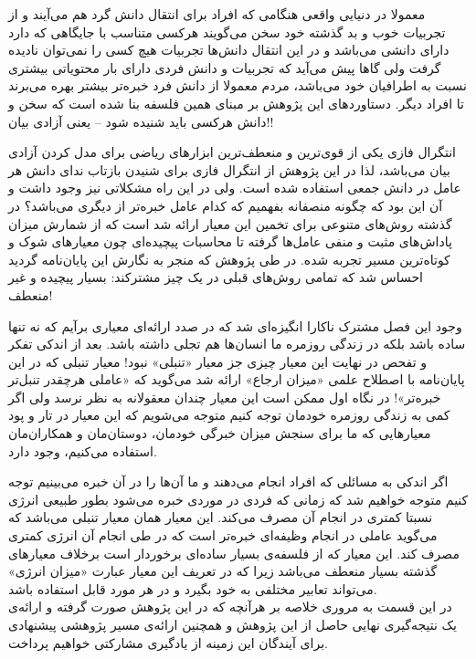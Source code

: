 معمولا در دنیایی واقعی هنگامی که افراد برای انتقال دانش گرد هم می‌آیند و از تجربیات خوب و بد گذشته خود سخن می‌گویند هرکسی متناسب با جایگاهی که دارد دارای دانشی می‌باشد و در این انتقال دانش‌ها تجربیات هیچ کسی را نمی‌توان نادیده گرفت ولی گاها پیش می‌آید که تجربیات و دانش فردی دارای بار محتویاتی بیشتری نسبت به اطرافیان خود می‌باشد، مردم معمولا از دانش فرد خبره‌تر بیشتر بهره می‌برند تا افراد دیگر. دستاورد‌های این پژوهش بر مبنای همین فلسفه بنا شده است که سخن و دانش هرکسی باید شنیده شود -- یعنی آزادی بیان!!

انتگرال فازی یکی از قوی‌ترین و منعطف‌ترین ابزارهای ریاضی برای مدل کردن آزادی بیان می‌باشد، لذا در این پژوهش از انتگرال فازی برای شنیدن بازتاب ندای دانش هر عامل در دانش جمعی استفاده شده است. ولی در این راه مشکلاتی نیز وجود داشت و آن این بود که چگونه منصفانه بفهمیم که کدام عامل خبره‌تر از دیگری می‌باشد؟ در گذشته روش‌های متنوعی برای تخمین این معیار ارائه شد است که از شمارش میزان پاداش‌های مثبت و منفی عامل‌ها گرفته تا محاسبات پیچیده‌ای چون معیار‌های شوک و کوتاه‌ترین مسیر تجربه شده. در طی پژوهش که منجر به نگارش این پایان‌نامه گردید احساس شد که تمامی روش‌های قبلی در یک چیز مشترکند: بسیار پیچیده و غیر منعطف!

وجود این فصل مشترک ناکارا انگیزه‌ای شد که در صدد ارائه‌ای معیاری برآیم که نه تنها ساده باشد بلکه در زندگی روزمره ما انسان‌ها هم تجلی داشته باشد. بعد از اندکی تفکر و تفحص در نهایت این معیار چیزی جز معیار «تنبلی» نبود! معیار تنبلی که در این پایان‌نامه با اصطلاح علمی «میزان ارجاع» ارائه شد می‌گوید که «عاملی هرچقدر تنبل‌تر خبره‌تر»! در نگاه اول ممکن است این معیار چندان معقولانه به نظر نرسد ولی اگر کمی به زندگی روزمره خودمان توجه کنیم متوجه می‌شویم که این معیار در تار و پود معیارهایی که ما برای سنجش میزان خبرگی خودمان، دوستان‌مان و همکاران‌مان استفاده می‌کنیم، وجود دارد.

اگر اندکی به مسائلی که افراد انجام می‌دهند و ما آن‌ها را در آن خبره می‌بینیم توجه کنیم متوجه خواهیم شد که زمانی که فردی در موردی خبره می‌شود بطور طبیعی انرژی نسبتا کمتری در انجام آن مصرف می‌کند. این معیار همان معیار تنبلی می‌باشد که می‌گوید عاملی در انجام وظیفه‌ای خبره‌تر است که در طی انجام آن انرژی کمتری مصرف کند. این معیار که از فلسفه‌ی بسیار ساده‌ای برخوردار است برخلاف معیار‌های گذشته بسیار منعطف می‌باشد زیرا که در تعریف این معیار عبارت «میزان انرژی» می‌تواند تعابیر مختلفی به خود بگیرد و در هر مورد قابل استفاده باشد.\\
در این قسمت به مروری خلاصه بر هرآنچه که در این پژوهش صورت گرفته و ارائه‌ی یک نتیجه‌گیری نهایی حاصل از این پژوهش و همچنین ارائه‌ی مسیر پژوهشی پیشنهادی برای آیندگان این زمینه از یادگیری مشارکتی خواهیم پرداخت.


